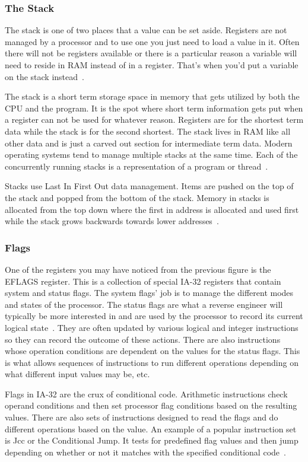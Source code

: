 \subsubsection{The Stack}
The stack is one of two places that a value can be set aside. 
Registers are not managed by a processor and to use one you just need to load a value in it. 
Often there will not be registers available or there is a particular reason a variable will need to reside in RAM instead of in a register. 
That’s when you’d put a variable on the stack instead~\cite{Reversing}.

The stack is a short term storage space in memory that gets utilized by both the CPU and the program. 
It is the spot where short term information gets put when a register can not be used for whatever reason. 
Registers are for the shortest term data while the stack is for the second shortest. 
The stack lives in RAM like all other data and is just a carved out section for intermediate term data. 
Modern operating systems tend to manage multiple stacks at the same time. 
Each of the concurrently running stacks is a representation of a program or thread~\cite{MasteringRE}.

Stacks use Last In First Out data management. 
Items are pushed on the top of the stack and popped from the bottom of the stack. 
Memory in stacks is allocated from the top down where the first in address is allocated and used first while the stack grows backwards towards lower addresses~\cite{Reversing}.

\subsubsection{Flags}
One of the registers you may have noticed from the previous figure is the EFLAGS register. 
This is a collection of special IA-32 registers that contain system and status flags. 
The system flags’ job is to manage the different modes and states of the processor. 
The status flags are what a reverse engineer will typically be more interested in and are used by the processor to record its current logical state~\cite{Reversing}. 
They are often updated by various logical and integer instructions so they can record the outcome of these actions. 
There are also instructions whose operation conditions are dependent on the values for the status flags. 
This is what allows sequences of instructions to run different operations depending on what different input values may be, etc. 

Flags in IA-32 are the crux of conditional code. 
Arithmetic instructions check operand conditions and then set processor flag conditions based on the resulting values. 
There are also sets of instructions designed to read the flags and do different operations based on the value. 
An example of a popular instruction set is Jcc or the Conditional Jump. 
It tests for predefined flag values and then jump depending on whether or not it matches with the specified conditional code~\cite{intelManual}.

